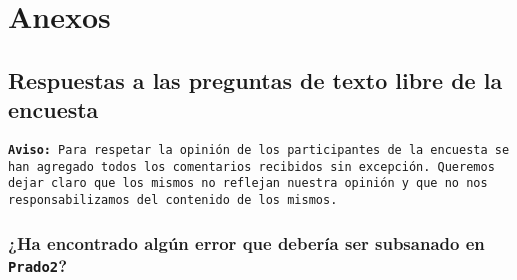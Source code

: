 \chapter{Anexos}

\section{Respuestas a las preguntas de texto libre de la encuesta}

\texttt{\textbf{Aviso:} Para respetar la opinión de los participantes de la encuesta se han agregado todos los comentarios recibidos sin excepción. Queremos dejar claro que los mismos no reflejan nuestra opinión y que no nos responsabilizamos del contenido de los mismos.}

\subsection{¿Ha encontrado algún error que debería ser subsanado en \texttt{Prado2}?}

